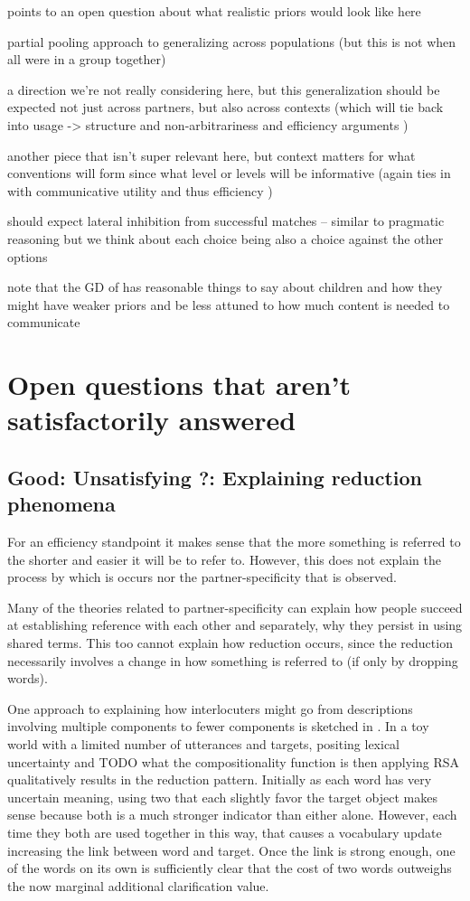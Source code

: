 \documentclass[]{article}
\begin{document}
points to an open question about what realistic priors would look like here

partial pooling approach to generalizing across populations (but this is not when all were in a group together) 

a direction we're not really considering here, but this generalization should be expected not just across partners, but also across contexts (which will tie back into usage -> structure and non-arbitrariness and efficiency arguments )

another piece that isn't super relevant here, but context matters for what conventions will form since what level or levels will be informative (again ties in with communicative utility and thus efficiency )

should expect lateral inhibition from successful matches -- similar to pragmatic reasoning but we think about each choice being also a choice against the other options 

note that the GD of \cite{hawkins2021} has reasonable things to say about children and how they might have weaker priors and be less attuned to how much content is needed to communicate 


\section{Open questions that aren't satisfactorily answered}
\subsection{Good: Unsatisfying ?: Explaining reduction phenomena}

For an efficiency standpoint it makes sense that the more something is referred to the shorter and easier it will be to refer to. However, this does not explain the process by which is occurs nor the partner-specificity that is observed. 

Many of the theories related to partner-specificity can explain how people succeed at establishing reference with each other and separately, why they persist in using shared terms. This too cannot explain how reduction occurs, since the reduction necessarily involves a change in how something is referred to (if only by dropping words). 

One approach to explaining how interlocuters might go from descriptions involving multiple components to fewer components is sketched in \cite{hawkins2021}. In a toy world with a limited number of utterances and targets, positing lexical uncertainty and TODO what the compositionality function is then applying RSA qualitatively results in the reduction pattern. Initially as each word has very uncertain meaning, using two that each slightly favor the target object makes sense because both is a much stronger indicator than either alone. However, each time they both are used together in this way, that causes a vocabulary update increasing the link between word and target. Once the link is strong enough, one of the words on its own is sufficiently clear that the cost of two words outweighs the now marginal additional clarification value. 
\end{document}
